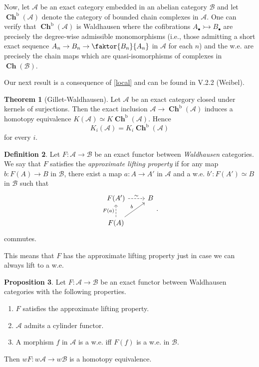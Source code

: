 \documentclass[10pt,letterpaper,cm]{nupset}
\theoremstyle{definition}
\newtheorem{definition}{Definition}[section]
\theoremstyle{theorem}
\newtheorem{theorem}[definition]{Theorem}
\newtheorem{prop}[definition]{Proposition}
\theoremstyle{remark}
\newcommand{\1}{\mathbf{1}}
\renewcommand{\a}{\mathscr{A}}
\renewcommand{\b}{\mathscr{B}}
\newcommand{\0}{\vec 0}
\DeclareMathOperator{\bo}{b}
\DeclareMathOperator{\ch}{\mathbf{Ch}}
\begin{document}
\smallskip

Now, let $\a$ be an exact category embedded in an abelian category $\b$ and let $\ch^{\bo}(\a)$ denote the category of bounded chain complexes in $\a$. One can verify that $\ch^{\bo}(\a)$ is Waldhausen where the cofibrations $A_{\bullet} \rightarrowtail B_{\bullet}$ are precisely the degree-wise admissible monomorphisms (i.e., those admitting a short exact sequence $A_n \to B_n \to \faktor{B_n}{A_n}$ in $\a$ for each $n$) and the w.e. are precisely the chain maps which are quasi-isomorphisms of complexes in $\ch(\b)$.

\medskip

Our next result is a consequence of \cref{local} and can be found in V.2.2 (Weibel).

\begin{theorem}[Gillet-Waldhausen]\label{GW}
Let $\a$ be an exact category closed under kernels of surjections. Then the exact inclusion $\a \to \ch^{\bo}(\a)$ induces a homotopy equivalence $K(\a) \simeq K\ch^{\bo}(\a)$. Hence $$K_i(\a) = K_i \ch^{\bo}(\a)$$ for every $i$.
\end{theorem}

\begin{definition}
Let $F: \a \to \b$ be an exact functor between \emph{Waldhausen} categories. We say that $F$ satisfies the \textit{approximate lifting property} if for any map $b: F(A) \to B$ in $\b$, there exist a map $a : A \to A'$ in $\a$ and a w.e. $b' : F(A') \simeq B$ in $\b$ such that
\[
\begin{tikzcd}
F(A') \arrow[r, "\sim", dashed] & B \\
F(A) \arrow[u, "F(a)", dashed] \arrow[ru, "b"] & 
\end{tikzcd}.
\]
commutes.
\end{definition}

This means that $F$ has the approximate lifting property just in case we can always lift to  a w.e.

\begin{prop}\label{pp}
Let $F: \a \to \b$ be an exact functor between Waldhausen categories with the following properties.
\begin{enumerate}
\item $F$ satisfies the approximate lifting property.
\item $\a$ admits a cylinder functor.
\item A morphism $f$ in $\a$ is a w.e. iff $F(f)$ is a w.e. in $\b$.
\end{enumerate}
Then $wF : w{\a} \to w{\b}$ is a homotopy equivalence.
\end{prop}
\end{document}
